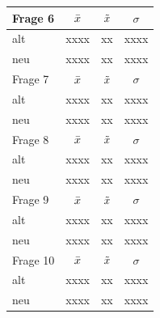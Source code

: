 \begin{table}[H]
\begin{tabular}{|l|c|c|c|}
\end{tabular}
\begin{tabular}{|l|c|c|c|}
\hline
Frage 6   & $\Bar{x}$ & $\Tilde{x}$ & $\sigma$ \\ \hline
alt       & xxxx      &  xx         &  xxxx    \\ \hline
neu       & xxxx      &  xx         &  xxxx    \\ \hline
\hline
Frage 7   & $\Bar{x}$ & $\Tilde{x}$ & $\sigma$ \\ \hline
alt       & xxxx      &  xx         &  xxxx    \\ \hline
neu       & xxxx      &  xx         &  xxxx    \\ \hline
\hline
Frage 8   & $\Bar{x}$ & $\Tilde{x}$ & $\sigma$ \\ \hline
alt       & xxxx      &  xx         &  xxxx    \\ \hline
neu       & xxxx      &  xx         &  xxxx    \\ \hline
\hline
Frage 9   & $\Bar{x}$ & $\Tilde{x}$ & $\sigma$ \\ \hline
alt       & xxxx      &  xx         &  xxxx    \\ \hline
neu       & xxxx      &  xx         &  xxxx    \\ \hline
\hline
Frage 10   & $\Bar{x}$ & $\Tilde{x}$ & $\sigma$ \\ \hline
alt       & xxxx      &  xx         &  xxxx    \\ \hline
neu       & xxxx      &  xx         &  xxxx    \\ \hline
\end{tabular}


\end{table}

